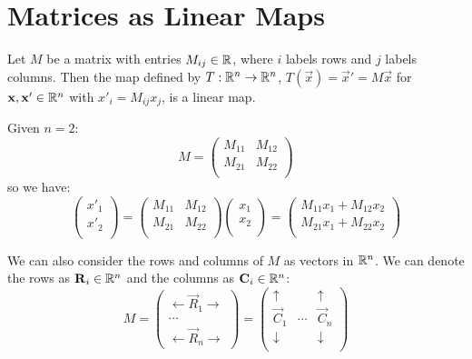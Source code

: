 \documentclass[../main.tex]{subfiles}
\begin{document}
\section{Matrices as Linear Maps}
Let $M$ be a matrix with entries $M_{i j} \in \mathbb{R}$, where $i$ labels rows and $j$ labels columns.
Then the map defined by $T: \mathbb{R}^{n} \to \mathbb{R}^{n}$, $T(\vec{x}) = \vec{x}' = M\vec{x}$ for $\boldsymbol{\mathbf{x}}, \boldsymbol{\mathbf{x}}' \in \mathbb{R}^{n}$ with $x'_i = M_{i j}x_j$, is a linear map.
\begin{example}
  Given $n = 2$:
  \[
    M = \begin{pmatrix}
    M_{1 1} & M_{1 2} \\
    M_{2 1} & M_{2 2} \\
    \end{pmatrix}
  \]
  so we have:
  \[
    \begin{pmatrix}
    x'_1 \\
    x'_2 \\
    \end{pmatrix}
    =
    \begin{pmatrix}
    M_{1 1} & M_{1 2} \\
    M_{2 1} & M_{2 2} \\
    \end{pmatrix}
    \begin{pmatrix}
    x_1 \\
    x_2 \\
    \end{pmatrix}
    =
    \begin{pmatrix}
    M_{1 1}x_1 + M_{1 2}x_2 \\
    M_{2 1}x_1 + M_{2 2}x_2 \\
    \end{pmatrix}
  \]
\end{example}
We can also consider the rows and columns of $M$ as vectors in $\mathbb{R}^{n}$.
We can denote the rows as $\boldsymbol{\mathbf{R}}_i \in \mathbb{R}^{n}$ and the columns as $\boldsymbol{\mathbf{C}}_i \in \mathbb{R}^{n}$:
\[
  M = \begin{pmatrix}
  \leftarrow \vec{R}_1 \rightarrow \\
  \cdots \\
  \leftarrow \vec{R}_n \rightarrow
  \end{pmatrix}
  =
  \begin{pmatrix}
  \uparrow & & \uparrow  \\
  \vec{C}_1 & \cdots & \vec{C}_n  \\
  \downarrow &  & \downarrow \\
  \end{pmatrix}
\]
\end{document}
